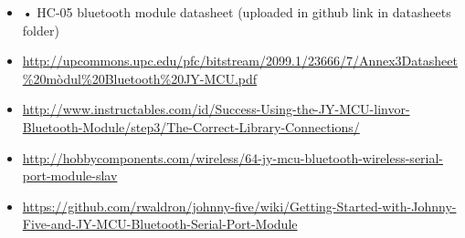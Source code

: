 \documentclass[12pt]{article}
\begin{document}
\begin{itemize}
	\item •	HC-05 bluetooth module datasheet (uploaded in github link in datasheets folder)
	\item \href{http://upcommons.upc.edu/pfc/bitstream/2099.1/23666/7/Annex3Datasheet\%20mòdul\%20Bluetooth\%20JY-MCU.pdf}{http://upcommons.upc.edu/pfc/bitstream/2099.1/23666/7/Annex3Datasheet\%20mòdul\%20Bluetooth\%20JY-MCU.pdf}
	\item \href{http://www.instructables.com/id/Success-Using-the-JY-MCU-linvor-Bluetooth-Module/step3/The-Correct-Library-Connections/}{http://www.instructables.com/id/Success-Using-the-JY-MCU-linvor-Bluetooth-Module/step3/The-Correct-Library-Connections/}
	\item \href{http://hobbycomponents.com/wireless/64-jy-mcu-bluetooth-wireless-serial-port-module-slave}{http://hobbycomponents.com/wireless/64-jy-mcu-bluetooth-wireless-serial-port-module-slav}
	\item \href{https://github.com/rwaldron/johnny-five/wiki/Getting-Started-with-Johnny-Five-and-JY-MCU-Bluetooth-Serial-Port-Module}{https://github.com/rwaldron/johnny-five/wiki/Getting-Started-with-Johnny-Five-and-JY-MCU-Bluetooth-Serial-Port-Module}
\end{itemize}
\end{document}
